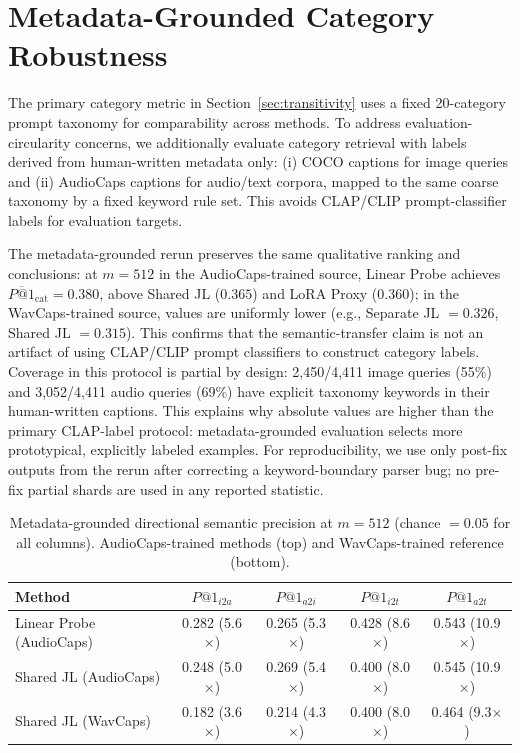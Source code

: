 \documentclass{article}
\begin{document}
\section{Metadata-Grounded Category Robustness}
\label{app:cat_indep}

The primary category metric in Section~\ref{sec:transitivity} uses a fixed 20-category prompt taxonomy for comparability across methods.
To address evaluation-circularity concerns, we additionally evaluate category retrieval with labels derived from human-written metadata only:
(i) COCO captions for image queries and (ii) AudioCaps captions for audio/text corpora, mapped to the same coarse taxonomy by a fixed keyword rule set.
This avoids CLAP/CLIP prompt-classifier labels for evaluation targets.

The metadata-grounded rerun preserves the same qualitative ranking and conclusions:
at $m=512$ in the AudioCaps-trained source, Linear Probe achieves $\overline{P\text{@}1}_\mathrm{cat}=0.380$, above Shared JL ($0.365$) and LoRA Proxy ($0.360$);
in the WavCaps-trained source, values are uniformly lower (e.g., Separate JL $=0.326$, Shared JL $=0.315$).
This confirms that the semantic-transfer claim is not an artifact of using CLAP/CLIP prompt classifiers to construct category labels.
Coverage in this protocol is partial by design: 2,450/4,411 image queries (55\%) and 3,052/4,411 audio queries (69\%) have explicit taxonomy keywords in their human-written captions.
This explains why absolute values are higher than the primary CLAP-label protocol: metadata-grounded evaluation selects more prototypical, explicitly labeled examples.
For reproducibility, we use only post-fix outputs from the rerun after correcting a keyword-boundary parser bug; no pre-fix partial shards are used in any reported statistic.

\begin{table}[ht]
  \caption{Metadata-grounded directional semantic precision at $m=512$ (chance $=0.05$ for all columns).
  AudioCaps-trained methods (top) and WavCaps-trained reference (bottom).}
  \label{tab:cat_indep_dir}
  \centering
  \footnotesize
  \begin{tabular}{lcccc}
    \toprule
    Method & $P\text{@}1_{i2a}$ & $P\text{@}1_{a2i}$ & $P\text{@}1_{i2t}$ & $P\text{@}1_{a2t}$ \\
    \midrule
    Linear Probe (AudioCaps) & 0.282 (5.6$\times$) & 0.265 (5.3$\times$) & 0.428 (8.6$\times$) & 0.543 (10.9$\times$) \\
    Shared JL (AudioCaps)    & 0.248 (5.0$\times$) & 0.269 (5.4$\times$) & 0.400 (8.0$\times$) & 0.545 (10.9$\times$) \\
    \midrule
    Shared JL (WavCaps)      & 0.182 (3.6$\times$) & 0.214 (4.3$\times$) & 0.400 (8.0$\times$) & 0.464 (9.3$\times$) \\
    \bottomrule
  \end{tabular}
\end{table}
\end{document}
